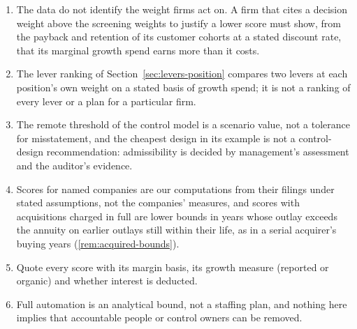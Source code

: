 \begin{enumerate}[leftmargin=*]
\item The data do not identify the weight firms act on. A firm that cites a decision weight above the screening weights to justify a lower score must show, from the payback and retention of its customer cohorts at a stated discount rate, that its marginal growth spend earns more than it costs.
\item The lever ranking of Section~\ref{sec:levers-position} compares two levers at each position's own weight on a stated basis of growth spend; it is not a ranking of every lever or a plan for a particular firm.
\item The remote threshold of the control model is a scenario value, not a tolerance for misstatement, and the cheapest design in its example is not a control-design recommendation: admissibility is decided by management's assessment and the auditor's evidence.
\item Scores for named companies are our computations from their filings under stated assumptions, not the companies' measures, and scores with acquisitions charged in full are lower bounds in years whose outlay exceeds the annuity on earlier outlays still within their life, as in a serial acquirer's buying years (\autoref{rem:acquired-bounds}).
\item Quote every score with its margin basis, its growth measure (reported or organic) and whether interest is deducted.
\item Full automation is an analytical bound, not a staffing plan, and nothing here implies that accountable people or control owners can be removed.
\end{enumerate}

